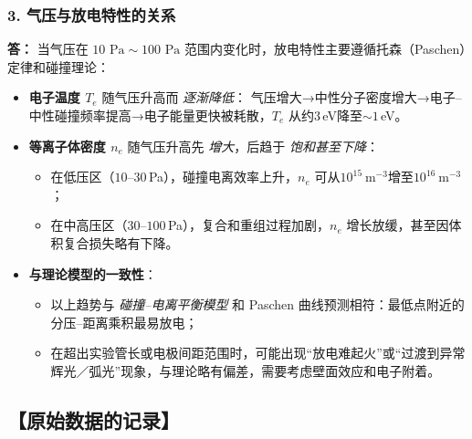 \documentclass[12pt,a4paper,UTF8]{ctexart}
\begin{document}
\subsubsection*{3. 气压与放电特性的关系}
\textbf{答：}  
当气压在 $10\text{ Pa}\sim100\text{ Pa}$ 范围内变化时，放电特性主要遵循托森（Paschen）定律和碰撞理论：
\begin{itemize}
  \item \textbf{电子温度 $T_e$} 随气压升高而 \emph{逐渐降低}：  
  气压增大→中性分子密度增大→电子–中性碰撞频率提高→电子能量更快被耗散，$T_e$ 从约$3\,$eV降至$\sim1\,$eV。
  \item \textbf{等离子体密度 $n_e$} 随气压升高先 \emph{增大}，后趋于 \emph{饱和甚至下降}：  
  \begin{itemize}
    \item 在低压区（$10\text{–}30\,$Pa），碰撞电离效率上升，$n_e$ 可从$10^{15}$ m$^{-3}$增至$10^{16}$ m$^{-3}$；  
    \item 在中高压区（$30\text{–}100\,$Pa），复合和重组过程加剧，$n_e$ 增长放缓，甚至因体积复合损失略有下降。
  \end{itemize}
  \item \textbf{与理论模型的一致性}：  
  \begin{itemize}
    \item 以上趋势与 \emph{碰撞–电离平衡模型} 和 Paschen 曲线预测相符：最低点附近的分压–距离乘积最易放电；  
    \item 在超出实验管长或电极间距范围时，可能出现“放电难起火”或“过渡到异常辉光／弧光”现象，与理论略有偏差，需要考虑壁面效应和电子附着。
  \end{itemize}
\end{itemize}




\subsection*{【原始数据的记录】}

\end{document}
